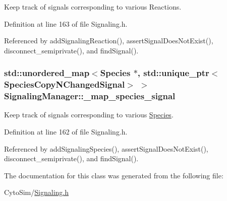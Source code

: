 Keep track of signals corresponding to various Reactions. 



Definition at line 163 of file Signaling.\-h.



Referenced by add\-Signaling\-Reaction(), assert\-Signal\-Does\-Not\-Exist(), disconnect\-\_\-semiprivate(), and find\-Signal().

\hypertarget{classSignalingManager_a4d3a730d33369a40aa09b711dcdc74f0}{
\subsubsection[{\-\_\-map\-\_\-species\-\_\-signal}]{\setlength{\rightskip}{0pt plus 5cm}std\-::unordered\-\_\-map$<${\bf Species} $\ast$, std\-::unique\-\_\-ptr$<${\bf Species\-Copy\-N\-Changed\-Signal}$>$ $>$ {\bf Signaling\-Manager\-::\-\_\-map\-\_\-species\-\_\-signal}}}\label{classSignalingManager_a4d3a730d33369a40aa09b711dcdc74f0}


Keep track of signals corresponding to various \hyperlink{classSpecies}{Species}. 



Definition at line 162 of file Signaling.\-h.



Referenced by add\-Signaling\-Species(), assert\-Signal\-Does\-Not\-Exist(), disconnect\-\_\-semiprivate(), and find\-Signal().



The documentation for this class was generated from the following file\-:\begin{DoxyCompactItemize}
\item 
Cyto\-Sim/\hyperlink{Signaling_8h}{Signaling.\-h}\end{DoxyCompactItemize}
